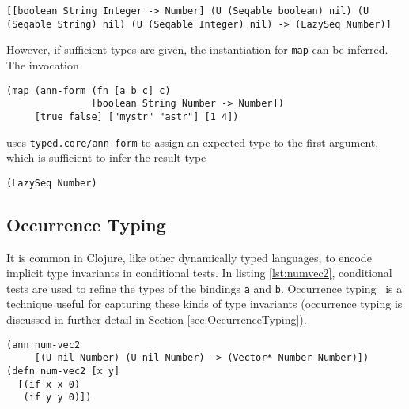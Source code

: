 \begin{lstlisting}
[[boolean String Integer -> Number] (U (Seqable boolean) nil) (U (Seqable String) nil) (U (Seqable Integer) nil) -> (LazySeq Number)]
\end{lstlisting}

However, if sufficient types are given, the instantiation for \lstinline|map| can be inferred.
The invocation

\begin{lstlisting}
(map (ann-form (fn [a b c] c) 
               [boolean String Number -> Number]) 
     [true false] ["mystr" "astr"] [1 4])
\end{lstlisting}

uses \lstinline|typed.core/ann-form| to assign an expected type to
the first argument,
which is sufficient to infer the result type

\begin{lstlisting}
(LazySeq Number)
\end{lstlisting}


\subsection{Occurrence Typing}

It is common in Clojure, like other dynamically typed languages, to
encode implicit type invariants in conditional tests.
In listing \ref{lst:numvec2}, conditional tests are used
to refine the types of the bindings \lstinline|a| and \lstinline|b|.
Occurrence typing~\cite{TF10} is a technique useful for capturing these kinds
of type invariants (occurrence typing is discussed in further detail in Section \ref{sec:OccurrenceTyping}).

\begin{lstlisting}[caption=Example of occurrence typing in Typed Clojure, label=lst:numvec2]
(ann num-vec2 
     [(U nil Number) (U nil Number) -> (Vector* Number Number)])
(defn num-vec2 [x y]
  [(if x x 0) 
   (if y y 0)])
\end{lstlisting}

